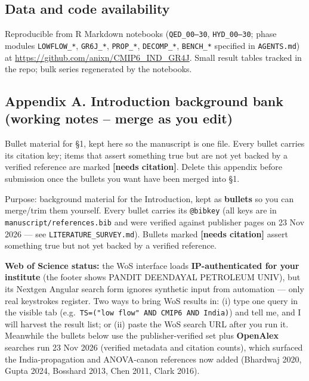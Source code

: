 \documentclass[
  english,
  11pt,
]{article}
\begin{document}
\subsection{Data and code
availability}\label{data-and-code-availability}

Reproducible from R Markdown notebooks (\texttt{QED\_00–30},
\texttt{HYD\_00–30}; phase modules \texttt{LOWFLOW\_*},
\texttt{GR6J\_*}, \texttt{PROP\_*}, \texttt{DECOMP\_*},
\texttt{BENCH\_*} specified in \texttt{AGENTS.md}) at
\url{https://github.com/anixn/CMIP6_IND_GR4J}. Small result tables
tracked in the repo; bulk series regenerated by the notebooks.

\subsection{Appendix A. Introduction background bank (working notes --
merge as you
edit)}\label{appendix-a.-introduction-background-bank-working-notes-merge-as-you-edit}

Bullet material for §1, kept here so the manuscript is one file. Every
bullet carries its citation key; items that assert something true but
are not yet backed by a verified reference are marked \textbf{{[}needs
citation{]}}. Delete this appendix before submission once the bullets
you want have been merged into §1.

Purpose: background material for the Introduction, kept as
\textbf{bullets} so you can merge/trim them yourself. Every bullet
carries its \texttt{@bibkey} (all keys are in
\texttt{manuscript/references.bib} and were verified against publisher
pages on 23 Nov 2026 --- see \texttt{LITERATURE\_SURVEY.md}). Bullets
marked \textbf{{[}needs citation{]}} assert something true but not yet
backed by a verified reference.

\textbf{Web of Science status:} the WoS interface loads
\textbf{IP-authenticated for your institute} (the footer shows PANDIT
DEENDAYAL PETROLEUM UNIV), but its Nextgen Angular search form ignores
synthetic input from automation --- only real keystrokes register. Two
ways to bring WoS results in: (i) type one query in the visible tab
(e.g.~\texttt{TS=("low\ flow"\ AND\ CMIP6\ AND\ India)}) and tell me,
and I will harvest the result list; or (ii) paste the WoS search URL
after you run it. Meanwhile the bullets below use the publisher-verified
set plus \textbf{OpenAlex} searches run 23 Nov 2026 (verified metadata
and citation counts), which surfaced the India-propagation and
ANOVA-canon references now added (Bhardwaj 2020, Gupta 2024, Bosshard
2013, Chen 2011, Clark 2016).
\end{document}
